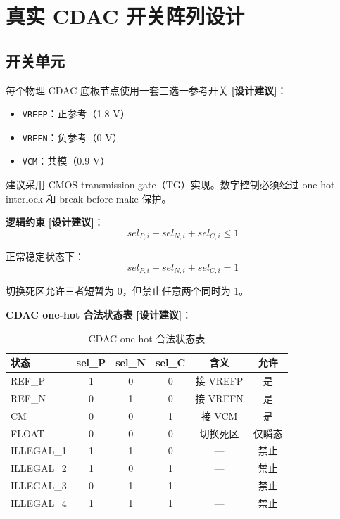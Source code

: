 \documentclass[UTF8,a4paper,11pt]{ctexart}
\newcommand{\suggested}{\textcolor{suggestblue}{\textbf{[设计建议]}}}
\begin{document}
\section{真实 CDAC 开关阵列设计}

\subsection{开关单元}

每个物理 CDAC 底板节点使用一套三选一参考开关 \suggested：

\begin{itemize}[leftmargin=2em]
\item \texttt{VREFP}：正参考（1.8 V）
\item \texttt{VREFN}：负参考（0 V）
\item \texttt{VCM}：共模（0.9 V）
\end{itemize}

建议采用 CMOS transmission gate（TG）实现。数字控制必须经过 one-hot interlock 和 break-before-make 保护。

\textbf{逻辑约束} \suggested：
\begin{equation}
sel_{P,i} + sel_{N,i} + sel_{C,i} \leq 1
\label{eq:onehot-leq}
\end{equation}

正常稳定状态下：
\begin{equation}
sel_{P,i} + sel_{N,i} + sel_{C,i} = 1
\label{eq:onehot-eq}
\end{equation}

切换死区允许三者短暂为 0，但禁止任意两个同时为 1。

\textbf{CDAC one-hot 合法状态表} \suggested：

\begin{table}[H]
\centering
\caption{CDAC one-hot 合法状态表}
\label{tab:onehot-states}
\begin{tabular}{lccccc}
\toprule
状态 & sel\_P & sel\_N & sel\_C & 含义 & 允许 \\
\midrule
REF\_P     & 1 & 0 & 0 & 接 VREFP   & 是 \\
REF\_N     & 0 & 1 & 0 & 接 VREFN   & 是 \\
CM         & 0 & 0 & 1 & 接 VCM     & 是 \\
FLOAT      & 0 & 0 & 0 & 切换死区   & 仅瞬态 \\
ILLEGAL\_1 & 1 & 1 & 0 & ---        & 禁止 \\
ILLEGAL\_2 & 1 & 0 & 1 & ---        & 禁止 \\
ILLEGAL\_3 & 0 & 1 & 1 & ---        & 禁止 \\
ILLEGAL\_4 & 1 & 1 & 1 & ---        & 禁止 \\
\bottomrule
\end{tabular}
\end{table}
\end{document}

